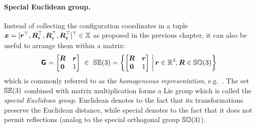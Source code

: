 \paragraph*{Special Euclidean group.}
Instead of collecting the configuration coordinates in a tuple $\boldsymbol{x} = [\boldsymbol{r}^\top, \boldsymbol{R}_{\mathsf{x}}^\top, \boldsymbol{R}_{\mathsf{y}}^\top, \boldsymbol{R}_{\mathsf{z}}^\top]^\top \in \mathbb{X}$ as proposed in the previous chapter, it can also be useful to arrange them within a matrix: 
\begin{align}
 \G = \begin{bmatrix} \R & \r \\ \mat{0} & 1 \end{bmatrix} \ \in \
 \SpecialEuclideanGroup(3) = \left\{ \begin{bmatrix} \R & \r \\ \mat{0} & 1 \end{bmatrix} \, \bigg| \, \r \in \RealNum^3, \R \in \SpecialOrthogonalGroup(3) \right\}
\end{align}
which is commonly referred to as the \textit{homogeneous representation}, e.g.\ \cite[sec.\ 2.3.1]{Murray:Robotic}.
The set $\mathbb{SE}(3)$ combined with matrix multiplication forms a Lie group which is called the \textit{special Euclidean group}.
Euclidean denotes to the fact that its transformations preserve the Euclidean distance, while special denotes to the fact that it does not permit reflections (analog to the special orthogonal group $\mathbb{SO}(3)$).

